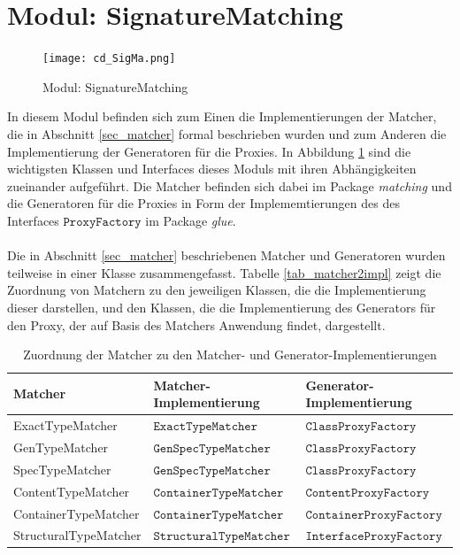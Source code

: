 \section{Modul: SignatureMatching}
\begin{figure}[h!]
\texttt{[image: cd\_SigMa.png]}
\caption{Modul: SignatureMatching}
\label{fig_cdSigMa}
\end{figure}
\noindent
In diesem Modul befinden sich zum Einen die Implementierungen der Matcher, die in Abschnitt \ref{sec_matcher} formal beschrieben wurden und zum Anderen die Implementierung der Generatoren für die Proxies. In Abbildung \ref{fig_cdSigMa} sind die wichtigsten Klassen und Interfaces dieses Moduls mit ihren Abhängigkeiten zueinander aufgeführt. Die Matcher befinden sich dabei im Package \emph{matching} und die Generatoren für die Proxies in Form der Implememtierungen des des Interfaces $\texttt{ProxyFactory}$ im Package \emph{glue}.
\\\\
Die in Abschnitt \ref{sec_matcher} beschriebenen Matcher und Generatoren wurden teilweise in einer Klasse zusammengefasst. Tabelle \ref{tab_matcher2impl} zeigt die Zuordnung von Matchern zu den jeweiligen Klassen, die die Implementierung dieser darstellen, und den Klassen, die die Implementierung des Generators für den Proxy, der auf Basis des Matchers Anwendung findet, dargestellt.
\begin{table}[h!]
\centering
\begin{tabular}{|l|l|l|}
\hline
\hline
\textbf{Matcher} & \textbf{Matcher-Implementierung} & \textbf{Generator-Implementierung}\\
\hline
ExactTypeMatcher & $\texttt{ExactTypeMatcher}$ & $\texttt{ClassProxyFactory}$ \\
\hline
GenTypeMatcher & $\texttt{GenSpecTypeMatcher}$ & $\texttt{ClassProxyFactory}$\\
\hline
SpecTypeMatcher & $\texttt{GenSpecTypeMatcher}$ & $\texttt{ClassProxyFactory}$\\
\hline
ContentTypeMatcher & $\texttt{ContainerTypeMatcher}$ & $\texttt{ContentProxyFactory}$\\
\hline
ContainerTypeMatcher & $\texttt{ContainerTypeMatcher}$ & $\texttt{ContainerProxyFactory}$\\
\hline
StructuralTypeMatcher & $\texttt{StructuralTypeMatcher}$ & $\texttt{InterfaceProxyFactory}$\\
\hline
\hline
\end{tabular}
\caption{Zuordnung der Matcher zu den Matcher- und Generator-Implementierungen}
\end{table}\label{tab_matcher2impl}
